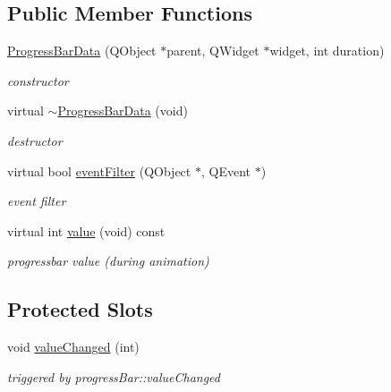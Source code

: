 \subsection*{Public Member Functions}
\begin{DoxyCompactItemize}
\item 
\mbox{\label{class_progress_bar_data_a78f8b5a7bad40ac9bb7aaa0660c9a148}} 
\hyperlink{class_progress_bar_data_a78f8b5a7bad40ac9bb7aaa0660c9a148}{Progress\+Bar\+Data} (Q\+Object $\ast$parent, Q\+Widget $\ast$widget, int duration)
\begin{DoxyCompactList}\small\item\em constructor \end{DoxyCompactList}\item 
\mbox{\label{class_progress_bar_data_afc0436a21bc54fbe84429afcbe4ed619}} 
virtual \hyperlink{class_progress_bar_data_afc0436a21bc54fbe84429afcbe4ed619}{$\sim$\+Progress\+Bar\+Data} (void)
\begin{DoxyCompactList}\small\item\em destructor \end{DoxyCompactList}\item 
\mbox{\label{class_progress_bar_data_ae4d8b14aa0687fe880df155d746d2851}} 
virtual bool \hyperlink{class_progress_bar_data_ae4d8b14aa0687fe880df155d746d2851}{event\+Filter} (Q\+Object $\ast$, Q\+Event $\ast$)
\begin{DoxyCompactList}\small\item\em event filter \end{DoxyCompactList}\item 
\mbox{\label{class_progress_bar_data_a07b23a9ea479b24c4bc03f785a9a9c4f}} 
virtual int \hyperlink{class_progress_bar_data_a07b23a9ea479b24c4bc03f785a9a9c4f}{value} (void) const
\begin{DoxyCompactList}\small\item\em progressbar value (during animation) \end{DoxyCompactList}\end{DoxyCompactItemize}
\subsection*{Protected Slots}
\begin{DoxyCompactItemize}
\item 
\mbox{\label{class_progress_bar_data_a1fc50cb8b8ee9cd838e8d8aca953c42c}} 
void \hyperlink{class_progress_bar_data_a1fc50cb8b8ee9cd838e8d8aca953c42c}{value\+Changed} (int)
\begin{DoxyCompactList}\small\item\em triggered by progress\+Bar\+::value\+Changed \end{DoxyCompactList}\end{DoxyCompactItemize}
